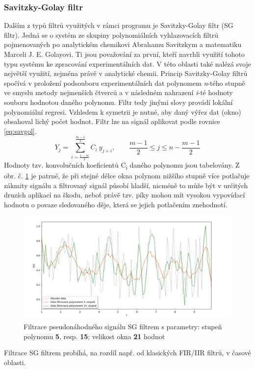 \documentclass[a4paper, 12pt]{article}
\begin{document}
\subsubsection{Savitzky-Golay filtr}
\label{sec:filtr2}
\textcolor{cdorange}{Dalším z typů filtrů využitých v rámci programu je Savitzky-Golay filtr (SG filtr).} Jedná se o systém ze skupiny polynomiálních vyhlazovacích filtrů pojmenovaných po analytickém chemikovi Abrahamu Savitzkym a  matematiku Marceli J. E. Golayovi. \cite{SGF} Ti jsou považování za první, kteří navrhli využití tohoto typu systému ke zpracování experimentálních dat. V této oblasti také nalézá svoje největší využití, zejména právě v analytické chemii. Princip Savitzky-Golay filtrů spočívá v proložení podsouboru experimentálních dat polynomem \textit{n}-tého stupně ve smyslu metody nejmenších čtverců a v následném nahrazení \textit{i}-té hodnoty souboru hodnotou daného polynomu. Filtr tedy jinými slovy provádí lokální polynomiální regresi. Vzhledem k symetrii je nutné, aby daný výřez dat (okno) obsahoval lichý počet hodnot.
Filtr lze na signál aplikovat podle rovnice \ref{eq:savgol}.
\begin{equation}
     Y_{j} = \sum_{i=\frac{1-m}{2}}^{\frac{m-1}{2}} C_{i}\ y_{j+i},\qquad \frac{m-1}{2} \leq j \leq n-\frac{m-1}{2}
\label{eq:savgol}
\end{equation}
Hodnoty tzv. konvolučních koeficientů C\textsubscript{i} daného polynomu jsou tabelovány.
Z obr. č. \ref{fig:theo_savitzkygol} je patrné, že při stejné délce okna polynom nižšího stupně více potlačuje zákmity signálu a filtrovaný signál působí hladší, nicméně to může být v určitých druzích aplikací na škodu, neboť právě tzv. píky mohou mít vysokou vypovídací hodnotu o povaze sledovaného děje, která se jejich potlačením znehodnotí.

\begin{figure}[hbt!]
 \includegraphics[width=\linewidth]{savgol_.png}
 \caption{Filtrace pseudonáhodného signálu SG filtrem s parametry: stupeň polynomu \textbf{5}, resp. \textbf{15}; velikost okna \textbf{21} hodnot}
 \centering
 \label{fig:theo_savitzkygol}
\end{figure}
\noindent Filtrace SG filtrem probíhá, na rozdíl např. od klasických FIR/IIR filtrů, v časové oblasti.
\end{document}
